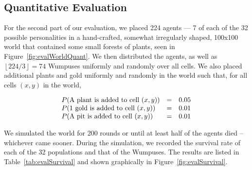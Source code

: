 \subsection{Quantitative Evaluation}

For the second part of our evaluation, we placed 224 agents --- 7 of each of the 32 possible personalities in a hand-crafted, somewhat irregularly shaped, 100x100 world that contained some small forests of plants, seen in Figure~\ref{fig:evalWorldQuant}. We then distributed the agents, as well as $\left\lfloor 224/3 \right\rfloor = 74$ Wumpuses uniformly and randomly over all cells. We also placed additional plants and gold uniformly and randomly in the world such that, for all cells $(x,y)$ in the world,

$$
	\begin{array}{l l l}
		P(\textrm{A plant is added to cell } (x,y)) & = & 0.05\\
		P(\textrm{1 gold is added to cell } (x,y)) & = & 0.01\\
		P(\textrm{A pit is added to cell } (x,y)) & = & 0.01
	\end{array}
$$

We simulated the world for 200 rounds or until at least half of the agents died -- whichever came sooner. During the simulation, we recorded the survival rate of each of the 32 populations and that of the Wumpuses. The results are listed in Table~\ref{tab:evalSurvival} and shown graphically in Figure~\ref{fig:evalSurvival}.


